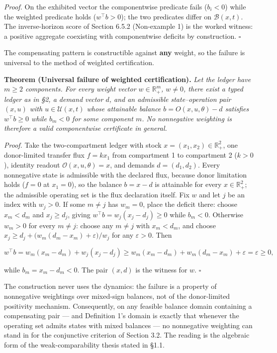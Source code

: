 \documentclass[11pt]{article}
\begin{document}
\emph{Proof.} On the exhibited vector the componentwise predicate fails (\(b_i < 0\)) while the weighted predicate holds (\(w^\top b > 0\)); the two predicates differ on \(\mathcal{B}(x,t)\). The inverse-horizon score of Section 6.5.2 (Non-example 1) is the worked witness: a positive aggregate coexisting with componentwise deficits by construction. \(\square\)

The compensating pattern is constructible against \textbf{any} weight, so the failure is universal to the method of weighted certification.

\textbf{Theorem (Universal failure of weighted certification).} \emph{Let the ledger have \(m \ge 2\) components. For every weight vector \(w\in\mathbb R^m_+\), \(w\ne0\), there exist a typed ledger as in \S2, a demand vector \(d\), and an admissible state--operation pair \((x,u)\) with \(u\in\mathcal U(x,t)\) whose attainable balance \(b=O(x,u,\theta)-d\) satisfies \(w^{\top}b\ge0\) while \(b_m<0\) for some component \(m\). No nonnegative weighting is therefore a valid componentwise certificate in general.}

\emph{Proof.} Take the two-compartment ledger with stock \(x =\allowbreak{} (x_1,\allowbreak{} x_2) \in \mathbb{R}^2_+\allowbreak{}\), one donor-limited transfer flux \(f = kx_1\) from compartment 1 to compartment 2 (\(k > 0\)), identity readout \(\mathcal{O}(x, u, \theta) = x\), and demands \(d = (d_1, d_2)\). Every nonnegative state is admissible with the declared flux, because donor limitation holds (\(f = 0\) at \(x_1 = 0\)), so the balance \(b = x - d\) is attainable for every \(x \in \mathbb{R}^2_+\); the admissible operating set is the flux declaration itself. Fix \(w\) and let \(j\) be an index with \(w_j > 0\). If some \(m \neq j\) has \(w_m = 0\), place the deficit there: choose \(x_m < d_m\) and \(x_j \ge d_j\), giving \(w^\top b =\allowbreak{} w_j (x_j - d_j) \ge 0\) while \(b_m < 0\). Otherwise \(w_m > 0\) for every \(m \neq j\): choose any \(m \neq j\) with \(x_m < d_m\), and choose \(x_j \ge d_j +\allowbreak{} \bigl( w_m (d_m - x_m) +\allowbreak{} \varepsilon \bigr)/w_j\) for any \(\varepsilon > 0\). Then 

$$w^\top b = w_m (x_m - d_m) + w_j (x_j - d_j) \ge w_m (x_m - d_m) + w_m (d_m - x_m) + \varepsilon = \varepsilon \ge 0,$$

 while \(b_m = x_m - d_m < 0\). The pair \((x, d)\) is the witness for \(w\). \(\square\)

The construction never uses the dynamics: the failure is a property of nonnegative weightings over mixed-sign balances, not of the donor-limited positivity mechanism. Consequently, on any feasible balance domain containing a compensating pair --- and Definition 1's domain is exactly that whenever the operating set admits states with mixed balances --- no nonnegative weighting can stand in for the conjunctive criterion of Section 3.2. The reading is the algebraic form of the weak-comparability thesis stated in \S1.1.
\end{document}
